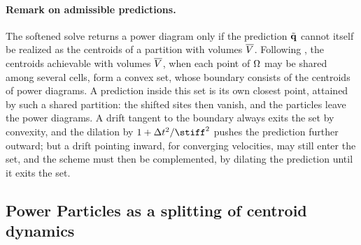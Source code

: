 \documentclass[main.tex]{subfiles}
\begin{document}
\paragraph{Remark on admissible predictions.}
The softened solve returns a power diagram only if the prediction $\tilde{\mathbf{q}}$ cannot itself be realized as the centroids of a partition with volumes $\overline{V}$.
Following \citet{Bourne2026ConvexOrder}, the centroids achievable with volumes $\overline{V}$, when each point of $\Omega$ may be shared among several cells, form a convex set, whose boundary consists of the centroids of power diagrams.
A prediction inside this set is its own closest point, attained by such a shared partition: the shifted sites then vanish, and the particles leave the power diagrams.
A drift tangent to the boundary always exits the set by convexity, and the dilation by $1 + \tstep^2/\stiff^2$ pushes the prediction further outward; but a drift pointing inward, \eg for converging velocities, may still enter the set, and the scheme must then be complemented, \eg by dilating the prediction until it exits the set.

\subsection{Power Particles as a splitting of centroid dynamics}
\label{sec:flow-pp}
\end{document}
